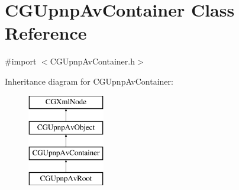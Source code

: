 \hypertarget{interface_c_g_upnp_av_container}{\section{C\-G\-Upnp\-Av\-Container Class Reference}
\label{interface_c_g_upnp_av_container}
}


{\ttfamily \#import $<$C\-G\-Upnp\-Av\-Container.\-h$>$}

Inheritance diagram for C\-G\-Upnp\-Av\-Container\-:\begin{figure}[H]
\begin{center}
\leavevmode
\includegraphics[height=4.000000cm]{interface_c_g_upnp_av_container}
\end{center}
\end{figure}

